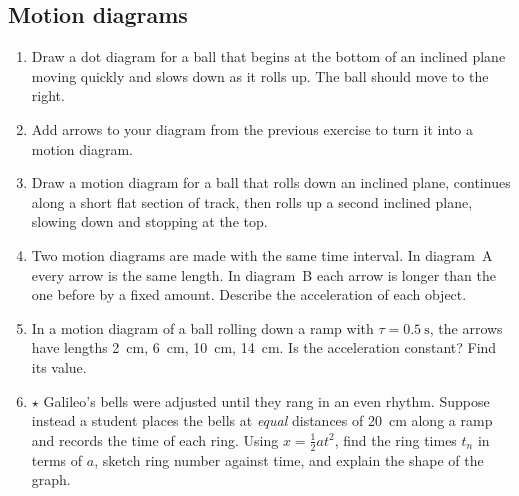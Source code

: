 \documentclass[11pt,twoside,openany]{book}
\begin{document}
\subsection*{Motion diagrams}
\begin{enumerate}[label=\textbf{\thechapter.\arabic*},resume=exercises,leftmargin=*]
  \item Draw a dot diagram for a ball that begins at the bottom of an inclined plane moving quickly and slows down as it rolls up. The ball should move to the right.
  \item Add arrows to your diagram from the previous exercise to turn it into a motion diagram.
  \item Draw a motion diagram for a ball that rolls down an inclined plane, continues along a short flat section of track, then rolls up a second inclined plane, slowing down and stopping at the top.
  \item Two motion diagrams are made with the same time interval. In diagram~A every arrow is the same length. In diagram~B each arrow is longer than the one before by a fixed amount. Describe the acceleration of each object.
  \item In a motion diagram of a ball rolling down a ramp with $\tau = \SI{0.5}{\second}$, the arrows have lengths \SI{2}{\centi\metre}, \SI{6}{\centi\metre}, \SI{10}{\centi\metre}, \SI{14}{\centi\metre}. Is the acceleration constant? Find its value.
  \item $\star$ Galileo's bells were adjusted until they rang in an even rhythm. Suppose instead a student places the bells at \emph{equal} distances of \SI{20}{\centi\metre} along a ramp and records the time of each ring. Using $x = \tfrac12 a t^2$, find the ring times $t_n$ in terms of $a$, sketch ring number against time, and explain the shape of the graph.
\end{enumerate}
\end{document}
